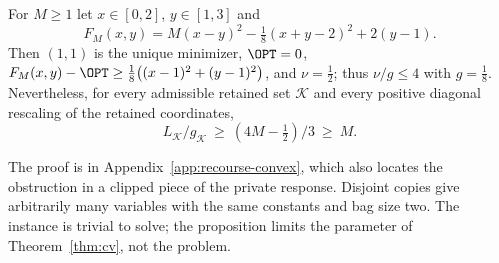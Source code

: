 \begin{proposition}\label{prop:cv-limit}
For $M\ge1$ let $x\in[0,2]$, $y\in[1,3]$ and
\[
F_M(x,y)=M(x-y)^2-\tfrac18(x+y-2)^2+2(y-1).
\]
Then $(1,1)$ is the unique minimizer, $\OPT=0$,
$F_M(x,y)-\OPT\ge\frac18\bigl((x-1)^2+(y-1)^2\bigr)$, and $\nu=\frac12$; thus
$\nu/g\le4$ with $g=\frac18$. Nevertheless, for every admissible retained
set $\mathcal K$ and every positive diagonal rescaling of the retained
coordinates,
\[
L_{\mathcal K}/g_{\mathcal K}\ \ge\ (4M-\tfrac12)/3\ \ge\ M.
\]
\end{proposition}

The proof is in Appendix~\ref{app:recourse-convex}, which also locates the
obstruction in a clipped piece of the private response. Disjoint copies give
arbitrarily many variables with the same constants and bag size two. The
instance is trivial to solve; the proposition limits the parameter of
Theorem~\ref{thm:cv}, not the problem.
